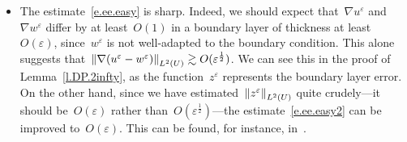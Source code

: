 \documentclass[11pt,twoside]{article} %
\numberwithin{equation}{section}
\theoremstyle{definition}
\let\originalleft\left
\let\originalright\right
\renewcommand{\left}{\mathopen{}\mathclose\bgroup\originalleft}
\renewcommand{\right}{\aftergroup\egroup\originalright}
\newcommand{\eps}{\varepsilon}
\newcommand{\ep}{\eps}
\begin{document}
\begin{itemize}
\item
The estimate~\eqref{e.ee.easy} is sharp. Indeed, we should expect that~$\nabla u^\ep$ and~$\nabla w^\ep$ differ by at least~$O(1)$ in a boundary layer of thickness at least~$O(\ep)$, since~$w^\ep$ is not well-adapted to the boundary condition. This alone suggests that~$\left\| \nabla (u^\ep-w^\ep) \right\|_{L^2(U)} \gtrsim O(\ep^{\frac12})$. We can see this in the proof of Lemma~\ref{l.DP.2infty}, as the function~$z^\ep$ represents the boundary layer error. On the other hand, since we have estimated~$\left\| z^\ep \right\|_{L^2(U)}$ quite crudely---it should be~$O(\ep)$ rather than~$O(\ep^{\frac12})$---the estimate~\eqref{e.ee.easy2} can be improved to~$O(\ep)$. This can be found, for instance, in~\cite[Section 6.4]{AKMBook}.
\end{itemize} 
\end{document}
